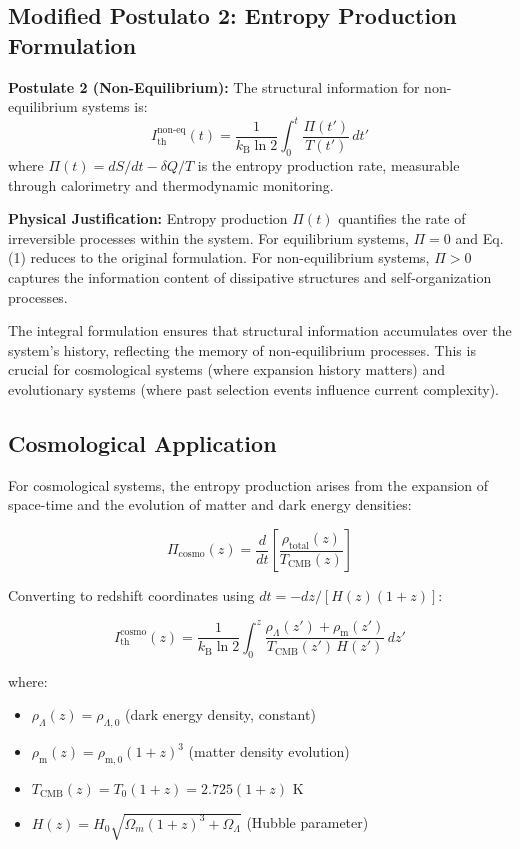 \documentclass[twocolumn,10pt]{IEEEtran}
\begin{document}
\subsection{Modified Postulato 2: Entropy Production Formulation}

\textbf{Postulate 2 (Non-Equilibrium):} The structural information for non-equilibrium systems is:
\begin{equation}
I_{\text{th}}^{\text{non-eq}}(t)=\frac{1}{k_{\text{B}}\ln 2}\int_{0}^{t}\!\frac{\Pi(t')}{T(t')}\,dt'
\end{equation}
where $\Pi(t) = dS/dt - \delta Q/T$ is the entropy production rate, measurable through calorimetry and thermodynamic monitoring.

\textbf{Physical Justification:} Entropy production $\Pi(t)$ quantifies the rate of irreversible processes within the system. For equilibrium systems, $\Pi = 0$ and Eq. (1) reduces to the original formulation. For non-equilibrium systems, $\Pi > 0$ captures the information content of dissipative structures and self-organization processes.

The integral formulation ensures that structural information accumulates over the system's history, reflecting the memory of non-equilibrium processes. This is crucial for cosmological systems (where expansion history matters) and evolutionary systems (where past selection events influence current complexity).

\subsection{Cosmological Application}

For cosmological systems, the entropy production arises from the expansion of space-time and the evolution of matter and dark energy densities:

\begin{equation}
\Pi_{\text{cosmo}}(z) = \frac{d}{dt}\left[\frac{\rho_{\text{total}}(z)}{T_{\text{CMB}}(z)}\right]
\end{equation}

Converting to redshift coordinates using $dt = -dz/[H(z)(1+z)]$:

\begin{equation}
I_{\text{th}}^{\text{cosmo}}(z)=\frac{1}{k_{\text{B}}\ln 2}\int_{0}^{z}\!\frac{\rho_{\Lambda}(z')+\rho_{\text{m}}(z')}{T_{\text{CMB}}(z')\,H(z')}\,dz'
\end{equation}

where:
\begin{itemize}
\item $\rho_{\Lambda}(z) = \rho_{\Lambda,0}$ (dark energy density, constant)
\item $\rho_{\text{m}}(z) = \rho_{\text{m},0}(1+z)^3$ (matter density evolution)
\item $T_{\text{CMB}}(z) = T_0(1+z) = 2.725(1+z)$ K
\item $H(z) = H_0\sqrt{\Omega_m(1+z)^3 + \Omega_\Lambda}$ (Hubble parameter)
\end{itemize}
\end{document}
